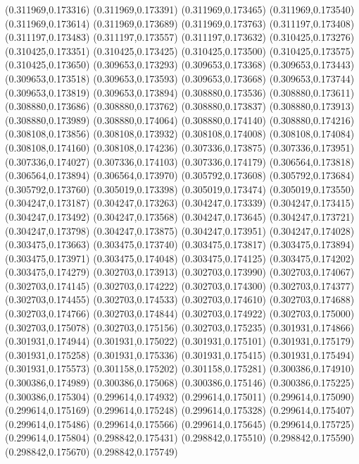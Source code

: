 (0.311969,0.173316)
(0.311969,0.173391)
(0.311969,0.173465)
(0.311969,0.173540)
(0.311969,0.173614)
(0.311969,0.173689)
(0.311969,0.173763)
(0.311197,0.173408)
(0.311197,0.173483)
(0.311197,0.173557)
(0.311197,0.173632)
(0.310425,0.173276)
(0.310425,0.173351)
(0.310425,0.173425)
(0.310425,0.173500)
(0.310425,0.173575)
(0.310425,0.173650)
(0.309653,0.173293)
(0.309653,0.173368)
(0.309653,0.173443)
(0.309653,0.173518)
(0.309653,0.173593)
(0.309653,0.173668)
(0.309653,0.173744)
(0.309653,0.173819)
(0.309653,0.173894)
(0.308880,0.173536)
(0.308880,0.173611)
(0.308880,0.173686)
(0.308880,0.173762)
(0.308880,0.173837)
(0.308880,0.173913)
(0.308880,0.173989)
(0.308880,0.174064)
(0.308880,0.174140)
(0.308880,0.174216)
(0.308108,0.173856)
(0.308108,0.173932)
(0.308108,0.174008)
(0.308108,0.174084)
(0.308108,0.174160)
(0.308108,0.174236)
(0.307336,0.173875)
(0.307336,0.173951)
(0.307336,0.174027)
(0.307336,0.174103)
(0.307336,0.174179)
(0.306564,0.173818)
(0.306564,0.173894)
(0.306564,0.173970)
(0.305792,0.173608)
(0.305792,0.173684)
(0.305792,0.173760)
(0.305019,0.173398)
(0.305019,0.173474)
(0.305019,0.173550)
(0.304247,0.173187)
(0.304247,0.173263)
(0.304247,0.173339)
(0.304247,0.173415)
(0.304247,0.173492)
(0.304247,0.173568)
(0.304247,0.173645)
(0.304247,0.173721)
(0.304247,0.173798)
(0.304247,0.173875)
(0.304247,0.173951)
(0.304247,0.174028)
(0.303475,0.173663)
(0.303475,0.173740)
(0.303475,0.173817)
(0.303475,0.173894)
(0.303475,0.173971)
(0.303475,0.174048)
(0.303475,0.174125)
(0.303475,0.174202)
(0.303475,0.174279)
(0.302703,0.173913)
(0.302703,0.173990)
(0.302703,0.174067)
(0.302703,0.174145)
(0.302703,0.174222)
(0.302703,0.174300)
(0.302703,0.174377)
(0.302703,0.174455)
(0.302703,0.174533)
(0.302703,0.174610)
(0.302703,0.174688)
(0.302703,0.174766)
(0.302703,0.174844)
(0.302703,0.174922)
(0.302703,0.175000)
(0.302703,0.175078)
(0.302703,0.175156)
(0.302703,0.175235)
(0.301931,0.174866)
(0.301931,0.174944)
(0.301931,0.175022)
(0.301931,0.175101)
(0.301931,0.175179)
(0.301931,0.175258)
(0.301931,0.175336)
(0.301931,0.175415)
(0.301931,0.175494)
(0.301931,0.175573)
(0.301158,0.175202)
(0.301158,0.175281)
(0.300386,0.174910)
(0.300386,0.174989)
(0.300386,0.175068)
(0.300386,0.175146)
(0.300386,0.175225)
(0.300386,0.175304)
(0.299614,0.174932)
(0.299614,0.175011)
(0.299614,0.175090)
(0.299614,0.175169)
(0.299614,0.175248)
(0.299614,0.175328)
(0.299614,0.175407)
(0.299614,0.175486)
(0.299614,0.175566)
(0.299614,0.175645)
(0.299614,0.175725)
(0.299614,0.175804)
(0.298842,0.175431)
(0.298842,0.175510)
(0.298842,0.175590)
(0.298842,0.175670)
(0.298842,0.175749)
